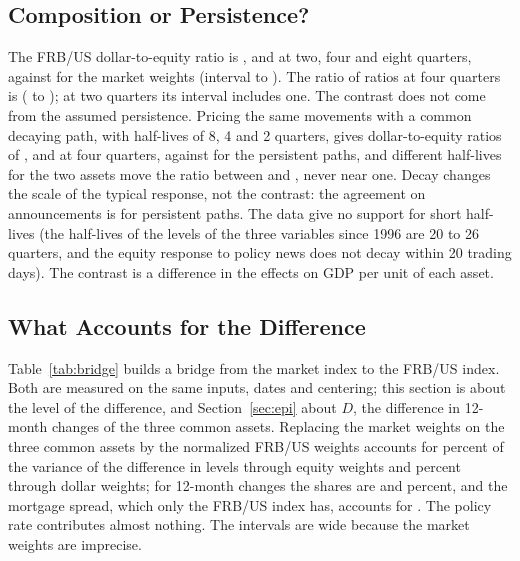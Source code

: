 \documentclass[11pt]{article}
\begin{document}
\subsection{Composition or Persistence?}\label{sec:persist}
The FRB/US dollar-to-equity ratio is ,  and  at two, four and eight quarters, against  for the market weights (interval  to ). The ratio of ratios at four quarters is  ( to ); at two quarters its interval includes one. The contrast does not come from the assumed persistence. Pricing the same movements with a common decaying path, with half-lives of 8, 4 and 2 quarters, gives dollar-to-equity ratios of ,  and  at four quarters, against  for the persistent paths, and different half-lives for the two assets move the ratio between  and , never near one. Decay changes the scale of the typical response, not the contrast: the agreement on announcements is for persistent paths. The data give no support for short half-lives (the half-lives of the levels of the three variables since 1996 are 20 to 26 quarters, and the equity response to policy news does not decay within 20 trading days). The contrast is a difference in the effects on GDP per unit of each asset.

\subsection{What Accounts for the Difference}\label{sec:accounting}
Table~\ref{tab:bridge} builds a bridge from the market index to the FRB/US index. Both are measured on the same inputs, dates and centering; this section is about the level of the difference, and Section~\ref{sec:epi} about $D$, the difference in 12-month changes of the three common assets. Replacing the market weights on the three common assets by the normalized FRB/US weights accounts for  percent of the variance of the difference in levels through equity weights and  percent through dollar weights; for 12-month changes the shares are  and  percent, and the mortgage spread, which only the FRB/US index has, accounts for . The policy rate contributes almost nothing. The intervals are wide because the market weights are imprecise.


\end{document}
